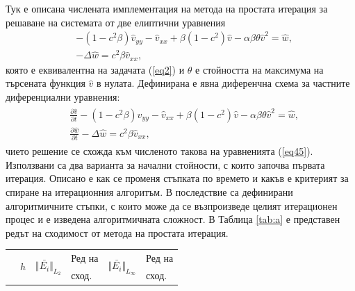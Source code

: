 \documentclass[a5paper]{article}
\newcommand{\rf}[1]{(\ref{#1})}
\theoremstyle{remark}
\begin{document}
\begin{normalsize}
Тук е описана числената имплементация на метода на простата итерация за решаване на системата от две елиптични уравнения \begin{equation}\label{eq45}
\begin{split}
 &- (1 - c^2 \beta) \widehat{v}_{yy} -\widehat{v}_{xx} + \beta (1-c^2) \widehat{v} - \alpha \beta \theta \widehat{v}^2 = \widehat{w}, \\
 &- \Delta \widehat{w} =  c^2 \beta \widehat{v}_{xx},
\end{split}
\end{equation}
която е еквивалентна на задачата \rf{eq2} и $\theta$ е стойността на максимума на търсената функция $\widehat{v}$ в нулата. Дефинирана е явна диференчна схема за частните диференциални уравнения:
\begin{align}\label{eq5}
\begin{split}
 &\frac {\partial \widehat{v}}{\partial t} - (1 - c^2 \beta) \widehat{v}_{yy} -\widehat{v}_{xx} + \beta (1-c^2) \widehat{v} - \alpha \beta \theta \widehat{v}^2 = \widehat{w}, \\
 &\frac {\partial \widehat{w}}{\partial t} - \Delta \widehat{w} =  c^2 \beta \widehat{v}_{xx},
\end{split}
\end{align}
чието решение се схожда към численото такова на уравненията \rf{eq45}.
Използвани са два варианта за начални стойности, с които започва първата итерация. Описано е как се променя стъпката по времето и какъв е критерият за спиране на итерационния алгоритъм. В последствие са дефинирани алгоритмичните стъпки, с които може да се възпроизведе целият итерационен процес и е изведена алгоритмичната сложност. В Таблица \ref{tab:a} е представен редът на сходимост от метода на простата итерация.

\begin{table}[ht]
\begin{footnotesize}
\centering
		\begin{tabular}{||c|l|ll|ll||}
			\hline
			\hline
      \multirow{2  }{*}{ }        & \multirow{2  }{*}{$h$}  &  	\multirow{2  }{*}{ $\Vert \bar{ E_i} \Vert_{L_2}$ }	&Ред на	& \multirow{2  }{*}{ $\Vert \bar{ E_i} \Vert_{L_\infty}$ } 		&Ред на   \\
	                                        &                                                & 							 					&  сход. 	& 								       					& сход. \\
   					\hline 
					\hline 


\end{tabular}
\end{footnotesize}
\end{table}
\end{normalsize}
\end{document}
